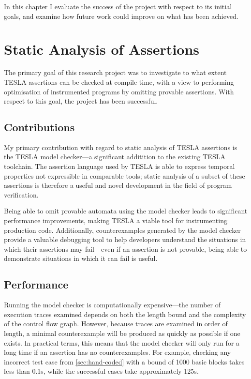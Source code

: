 In this chapter I evaluate the success of the project with respect to its
initial goals, and examine how future work could improve on what has been
achieved.

\section{Static Analysis of Assertions}

The primary goal of this research project was to investigate to what extent
TESLA assertions can be checked at compile time, with a view to performing
optimisation of instrumented programs by omitting provable assertions. With
respect to this goal, the project has been successful.

\subsection{Contributions}

My primary contribution with regard to static analysis of TESLA assertions is
the TESLA model checker---a significant additition to the existing
TESLA toolchain. The assertion language used by TESLA is able to express
temporal properties not expressible in comparable tools; static analysis of a
subset of these assertions is therefore a useful and novel development in the
field of program verification.

Being able to omit provable automata using the model checker leads to
significant performance improvements, making TESLA a viable tool for
instrumenting production code. Additionally, counterexamples generated by the
model checker provide a valuable debugging tool to help developers understand
the situations in which their assertions may fail---even if an assertion is not
provable, being able to demonstrate situations in which it can fail is useful.

\subsection{Performance}

Running the model checker is computationally expensive---the number of execution
traces examined depends on both the length bound and the complexity of the
control flow graph. However, because traces are examined in order of length, a
minimal counterexample will be produced as quickly as possible if one exists. In
practical terms, this means that the model checker will only run for a long time
if an assertion has no counterexamples. For example, checking any incorrect test
case from \autoref{sec:hand-coded} with a bound of \num{1000} basic blocks takes
less than \num{0.1}\si{\second}, while the successful cases take approximately
\num{125}\si{\second}.

